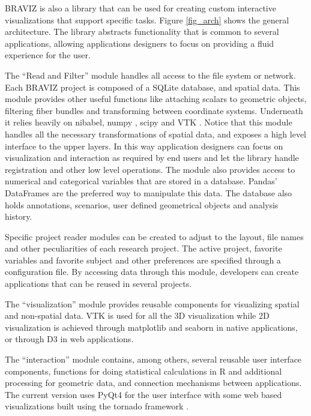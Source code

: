 \documentclass[utf8,paper]{frontiersSCNS} %
\begin{document}
BRAVIZ is also a library that can be used for creating custom interactive visualizations that support specific tasks. Figure \ref{fig_arch} shows the general architecture. The library abstracts functionality that is common to several applications, allowing applications designers to focus on providing a fluid experience for the user.

The ``Read and Filter'' module handles all access to the file system or network. Each BRAVIZ project is composed of a SQLite database, and spatial data. This module provides other useful functions like attaching scalars to geometric objects, filtering fiber bundles and transforming between coordinate systems. Underneath it relies heavily on nibabel\citep{gorgolewski_nipype:_2011}, numpy\citep{van_der_walt_numpy_2011} , scipy\citep{jones_scipy:_2001,oliphant_python_2007} and VTK\citep{schroeder_vtk_1998} . Notice that this module handles all the necessary transformations of spatial data, and exposes a high level interface to the upper layers. In this way application designers can focus on visualization and interaction as required by end users and let the library handle registration and other low level operations. The module also provides access to numerical and categorical variables that are stored in a database. Pandas' DataFrames\citep{mckinney_data_2010} are the preferred way to manipulate this data. The database also holds annotations, scenarios, user defined geometrical objects and analysis history. 

Specific project reader modules can be created to adjust to the layout, file names and other peculiarities of each research project. The active project, favorite variables and favorite subject and other preferences are specified through a configuration file.
By accessing data through this module, developers can create applications that can be reused in several projects. 

The ``visualization'' module provides reusable components for visualizing spatial and non-spatial data. VTK is used for all the 3D visualization while 2D visualization is achieved through matplotlib \citep{hunter_matplotlib:_2007} and seaborn\citep{michael_waskom_seaborn:_2014} in native applications, or through D3 \citep{bostock_d3_2011} in web applications.

The ``interaction'' module contains, among others, several reusable user interface components, functions for doing statistical calculations in R\citep{team_r:_2012, gautier_rpy2:_2008} and additional processing for geometric data, and connection mechanisms between applications. The current version uses PyQt4 for the user interface with some web based visualizations built using the tornado framework \citep{server_source_2008}. 
\end{document}

